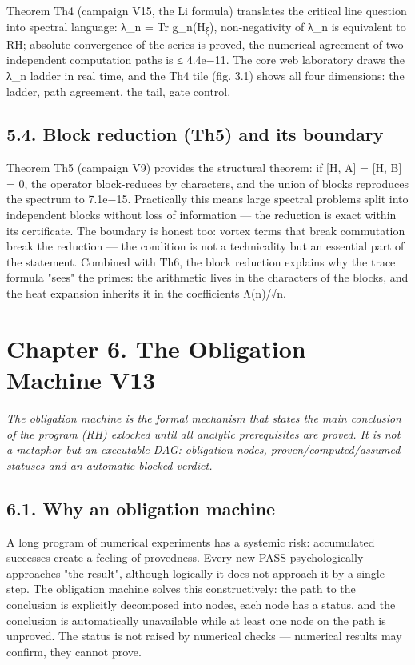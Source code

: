 \documentclass[11pt,a4paper]{article}
\begin{document}
Theorem Th4 (campaign V15, the Li formula) translates the critical line question into spectral language: λ\_n = Tr g\_n(H\textsubscript{ξ}), non-negativity of λ\_n is equivalent to RH; absolute convergence of the series is proved, the numerical agreement of two independent computation paths is ≤ 4.4e−11. The core web laboratory draws the λ\_n ladder in real time, and the Th4 tile (fig. 3.1) shows all four dimensions: the ladder, path agreement, the tail, gate control.

\subsection{5.4. Block reduction (Th5) and its boundary}

Theorem Th5 (campaign V9) provides the structural theorem: if [H, A] = [H, B] = 0, the operator block-reduces by characters, and the union of blocks reproduces the spectrum to 7.1e−15. Practically this means large spectral problems split into independent blocks without loss of information — the reduction is exact within its certificate. The boundary is honest too: vortex terms that break commutation break the reduction — the condition is not a technicality but an essential part of the statement. Combined with Th6, the block reduction explains why the trace formula "sees" the primes: the arithmetic lives in the characters of the blocks, and the heat expansion inherits it in the coefficients Λ(n)/√n.

\section{Chapter 6. The Obligation Machine V13}

\noindent\textit{\color{copper}The obligation machine is the formal mechanism that states the main conclusion of the program (RH) exlocked until all analytic prerequisites are proved. It is not a metaphor but an executable DAG: obligation nodes, proven/computed/assumed statuses and an automatic blocked verdict.}

\subsection{6.1. Why an obligation machine}

A long program of numerical experiments has a systemic risk: accumulated successes create a feeling of provedness. Every new PASS psychologically approaches "the result", although logically it does not approach it by a single step. The obligation machine solves this constructively: the path to the conclusion is explicitly decomposed into nodes, each node has a status, and the conclusion is automatically unavailable while at least one node on the path is unproved. The status is not raised by numerical checks — numerical results may confirm, they cannot prove.
\end{document}
